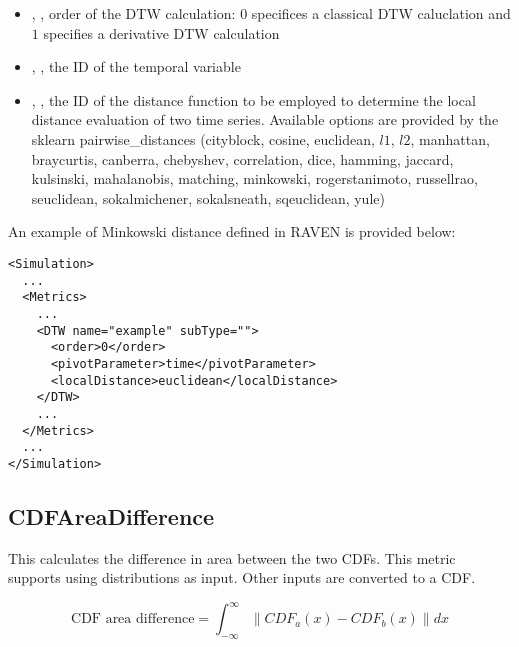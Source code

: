 \begin{itemize}
  \item {},          ,    order of the DTW calculation: $0$ specifices a classical DTW caluclation and $1$ specifies
                                                                    a derivative DTW calculation
  \item {}, , the ID of the temporal variable
  \item {},  , the ID of the distance function to be employed to determine the local distance
                                                                    evaluation of two time series. Available options are provided by the sklearn
                                                                    pairwise\_distances (cityblock, cosine, euclidean, $l1$, $l2$, manhattan,
                                                                    braycurtis, canberra, chebyshev, correlation, dice, hamming, jaccard,
                                                                    kulsinski, mahalanobis, matching, minkowski, rogerstanimoto, russellrao,
                                                                    seuclidean, sokalmichener, sokalsneath, sqeuclidean, yule)
\end{itemize}

An example of Minkowski distance defined in RAVEN is provided below:
\begin{lstlisting}[style=XML]
<Simulation>
  ...
  <Metrics>
    ...
    <DTW name="example" subType="">
      <order>0</order>
      <pivotParameter>time</pivotParameter>
      <localDistance>euclidean</localDistance>
    </DTW>
    ...
  </Metrics>
  ...
</Simulation>
\end{lstlisting}

\subsection{CDFAreaDifference}

This calculates the difference in area between the two CDFs.  This
metric supports using distributions as input.  Other inputs are
converted to a CDF.

\begin{equation}
  \text{CDF area difference} = \int_{-\infty}^{\infty}{\|CDF_a(x)-CDF_b(x)\|dx}
\end{equation}

